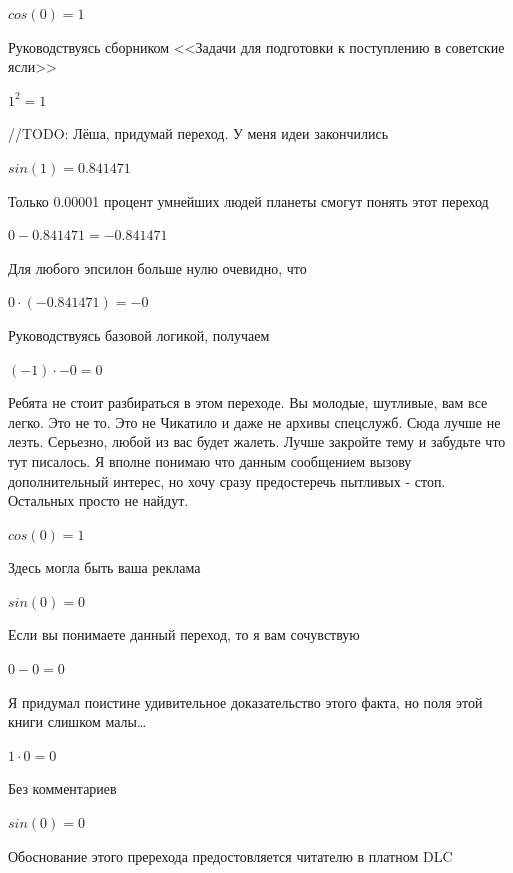 \documentclass[12pt,a4paper,fleqn]{article}
\begin{document}
\begin{center}$cos(0) = 1$\end{center}
Руководствуясь сборником <<Задачи для подготовки к поступлению в советские ясли>>\cite{link1}

\begin{center}$1^{2} = 1$\end{center}
//TODO: Лёша, придумай переход. У меня идеи закончились

\begin{center}$sin(1) = 0.841471$\end{center}
Только 0.00001 процент умнейших людей планеты смогут понять этот переход

\begin{center}$0-0.841471 = -0.841471$\end{center}
Для любого эпсилон больше нулю очевидно, что

\begin{center}$0 \cdot (-0.841471) = -0$\end{center}
Руководствуясь базовой логикой, получаем

\begin{center}$(-1) \cdot -0 = 0$\end{center}
Ребята не стоит разбираться в этом переходе. Вы молодые, шутливые, вам все легко. Это не то. Это не Чикатило и даже не архивы спецслужб. Сюда лучше не лезть. Серьезно, любой из вас будет жалеть. Лучше закройте тему и забудьте что тут писалось. Я вполне понимаю что данным сообщением вызову дополнительный интерес, но хочу сразу предостеречь пытливых - стоп. Остальных просто не найдут.

\begin{center}$cos(0) = 1$\end{center}
Здесь могла быть ваша реклама

\begin{center}$sin(0) = 0$\end{center}
Если вы понимаете данный переход, то я вам сочувствую

\begin{center}$0-0 = 0$\end{center}
Я придумал поистине удивительное доказательство этого факта, но поля этой книги слишком малы\ldots

\begin{center}$1 \cdot 0 = 0$\end{center}
Без комментариев\cite{link4}

\begin{center}$sin(0) = 0$\end{center}
Обоснование этого пререхода предостовляется читателю в платном DLC
\end{document}
